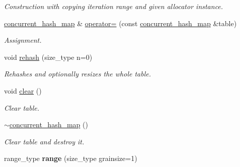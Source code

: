 \begin{DoxyCompactItemize}
\begin{DoxyCompactList}\small\item\em Construction with copying iteration range and given allocator instance. \end{DoxyCompactList}\item 
\hypertarget{classtbb_1_1interface5_1_1concurrent__hash__map_ad0f01ce516b8d3ab574954843622c7cd}{}\hyperlink{classtbb_1_1interface5_1_1concurrent__hash__map}{concurrent\+\_\+hash\+\_\+map} \& \hyperlink{classtbb_1_1interface5_1_1concurrent__hash__map_ad0f01ce516b8d3ab574954843622c7cd}{operator=} (const \hyperlink{classtbb_1_1interface5_1_1concurrent__hash__map}{concurrent\+\_\+hash\+\_\+map} \&table)\label{classtbb_1_1interface5_1_1concurrent__hash__map_ad0f01ce516b8d3ab574954843622c7cd}

\begin{DoxyCompactList}\small\item\em Assignment. \end{DoxyCompactList}\item 
void \hyperlink{classtbb_1_1interface5_1_1concurrent__hash__map_adf1fa9470c605731063e5949f0418eb7}{rehash} (size\+\_\+type n=0)
\begin{DoxyCompactList}\small\item\em Rehashes and optionally resizes the whole table. \end{DoxyCompactList}\item 
\hypertarget{classtbb_1_1interface5_1_1concurrent__hash__map_ab8295bc260b5e4df883fef11574b84c6}{}void \hyperlink{classtbb_1_1interface5_1_1concurrent__hash__map_ab8295bc260b5e4df883fef11574b84c6}{clear} ()\label{classtbb_1_1interface5_1_1concurrent__hash__map_ab8295bc260b5e4df883fef11574b84c6}

\begin{DoxyCompactList}\small\item\em Clear table. \end{DoxyCompactList}\item 
\hypertarget{classtbb_1_1interface5_1_1concurrent__hash__map_aa9db855aa80ce639ffcef786ae12fd09}{}\hyperlink{classtbb_1_1interface5_1_1concurrent__hash__map_aa9db855aa80ce639ffcef786ae12fd09}{$\sim$concurrent\+\_\+hash\+\_\+map} ()\label{classtbb_1_1interface5_1_1concurrent__hash__map_aa9db855aa80ce639ffcef786ae12fd09}

\begin{DoxyCompactList}\small\item\em Clear table and destroy it. \end{DoxyCompactList}\item 
\hypertarget{classtbb_1_1interface5_1_1concurrent__hash__map_a3f2076a43052ae0f9add158ffe7700db}{}range\+\_\+type {\bfseries range} (size\+\_\+type grainsize=1)\label{classtbb_1_1interface5_1_1concurrent__hash__map_a3f2076a43052ae0f9add158ffe7700db}


\end{DoxyCompactItemize}
